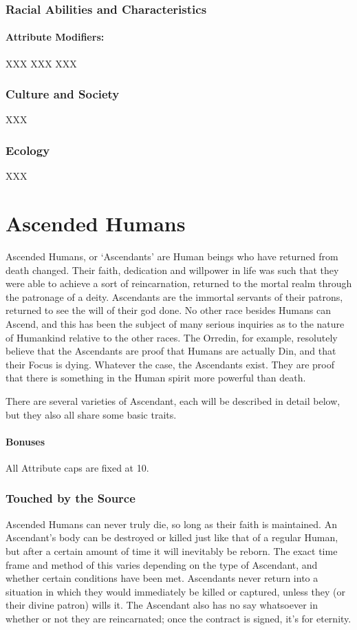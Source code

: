 \documentclass[oneside,11pt,english]{book}
\begin{document}
\subsubsection*{Racial Abilities and Characteristics} 
\paragraph{Attribute Modifiers:} XXX 
XXX 
XXX 
\subsubsection*{Culture and Society} 
XXX 
\subsubsection*{Ecology} 
XXX 
\section{Ascended Humans}
Ascended Humans, or ‘Ascendants’ are Human beings who have returned from death changed. Their faith, dedication and willpower in life was such that they were able to achieve a sort of reincarnation, 
returned to the mortal realm through the patronage of a deity. Ascendants are the immortal servants of 
their patrons, returned to see the will of their god done. No other race besides Humans can Ascend, and 
this has been the subject of many serious inquiries as to the nature of Humankind relative to the other 
races. The Orredin, for example, resolutely believe that the Ascendants are proof that Humans are actually 
Din, and that their Focus is dying. Whatever the case, the Ascendants exist. They are proof that there is 
something in the Human spirit more powerful than death. 


There are several varieties of Ascendant, each will be described in detail below, but they also all share some basic traits. 


\paragraph{Bonuses}
All Attribute caps are fixed at 10.
\subsubsection{Touched by the Source}
Ascended Humans can never truly die, so long as their faith is maintained. An Ascendant's body can be 
destroyed or killed just like that of a regular Human, but after a certain amount of time it will inevitably 
be reborn. The exact time frame and method of this varies depending on the type of Ascendant, and 
whether certain conditions have been met. Ascendants never return into a situation in which they would 
immediately be killed or captured, unless they (or their divine patron) wills it. The Ascendant also has no 
say whatsoever in whether or not they are reincarnated; once the contract is signed, it's for eternity. 
 
\end{document}

